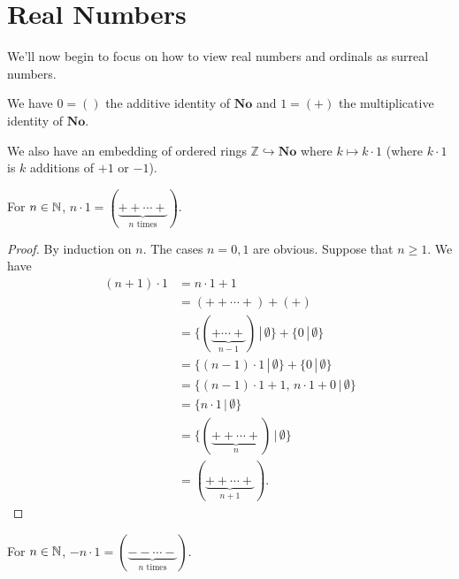 %
%
%
%


\section{Real Numbers}

We'll now begin to focus on how to view real numbers and ordinals as surreal numbers.

We have $0 = ()$ the additive identity of $\mathbf{No}$ and $1 = (+)$ the multiplicative identity of $\mathbf{No}$.

We also have an embedding of ordered rings $\mathbb{Z} \hookrightarrow \mathbf{No}$ where $k\mapsto k\cdot 1$ (where $k\cdot 1$ is $k$ additions of $+1$ or $-1$).

\begin{lemma}
For $n\in\mathbb{N}$, $n\cdot 1 = (\underbrace{++\cdots+}_{n\text{ times}})$.
\label{3.1}
\end{lemma}

\begin{proof}
By induction on $n$. The cases $n=0,1$ are obvious.
Suppose that $n\ge 1$. We have
\begin{align*}
(n+1)\cdot 1 &= n\cdot 1 + 1 \\
&= (++\cdots +)+(+) \\
&= \{ (\underbrace{+\cdots+}_{n-1}) \,|\, \emptyset \} + \{ 0 \,|\, \emptyset \} \\
&= \{ (n-1)\cdot1 \,|\, \emptyset \} + \{ 0 \,|\, \emptyset \} \\
&= \{(n-1)\cdot 1 + 1,\, n\cdot 1 + 0 \,|\, \emptyset \} \\
&= \{ n\cdot 1 \,|\, \emptyset \} \\
&= \{ (\underbrace{++\cdots + }_{n}) \,|\, \emptyset \} \\
&= (\underbrace{++\cdots +}_{n+1}).
\end{align*}
\end{proof}

\begin{cor}
For $n\in\mathbb{N}$, $-n\cdot 1 = (\underbrace{- - \cdots -}_{n\text{ times}})$.
\end{cor}

